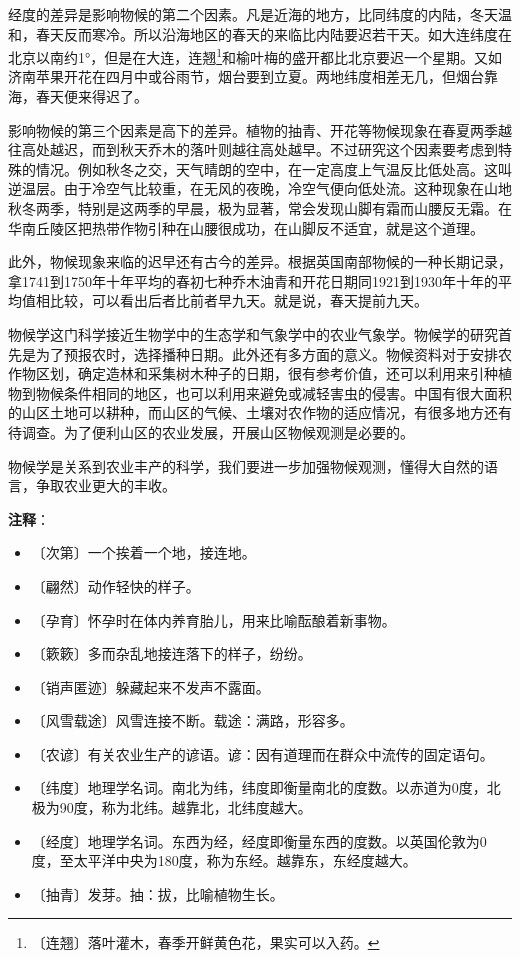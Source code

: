 \documentclass[12pt,UTF-8,openany]{ctexbook}
\begin{document}
\begin{normalsize}
    经度的差异是影响物候的第二个因素。凡是近海的地方，比同纬度的内陆，冬天温和，春天反而寒冷。所以沿海地区的春天的来临比内陆要迟若干天。如大连纬度在北京以南约1°，但是在大连，连翘\footnote{〔连翘〕落叶灌木，春季开鲜黄色花，果实可以入药。}和榆叶梅的盛开都比北京要迟一个星期。又如济南苹果开花在四月中或谷雨节，烟台要到立夏。两地纬度相差无几，但烟台靠海，春天便来得迟了。
    
    影响物候的第三个因素是高下的差异。植物的抽青、开花等物候现象在春夏两季越往高处越迟，而到秋天乔木的落叶则越往高处越早。不过研究这个因素要考虑到特殊的情况。例如秋冬之交，天气晴朗的空中，在一定高度上气温反比低处高。这叫逆温层。由于冷空气比较重，在无风的夜晚，冷空气便向低处流。这种现象在山地秋冬两季，特别是这两季的早晨，极为显著，常会发现山脚有霜而山腰反无霜。在华南丘陵区把热带作物引种在山腰很成功，在山脚反不适宜，就是这个道理。
    
    此外，物候现象来临的迟早还有古今的差异。根据英国南部物候的一种长期记录，拿1741到1750年十年平均的春初七种乔木油青和开花日期同1921到1930年十年的平均值相比较，可以看出后者比前者早九天。就是说，春天提前九天。
    
    物候学这门科学接近生物学中的生态学和气象学中的农业气象学。物候学的研究首先是为了预报农时，选择播种日期。此外还有多方面的意义。物候资料对于安排农作物区划，确定造林和采集树木种子的日期，很有参考价值，还可以利用来引种植物到物候条件相同的地区，也可以利用来避免或减轻害虫的侵害。中国有很大面积的山区土地可以耕种，而山区的气候、土壤对农作物的适应情况，有很多地方还有待调查。为了便利山区的农业发展，开展山区物候观测是必要的。
    
    物候学是关系到农业丰产的科学，我们要进一步加强物候观测，懂得大自然的语言，争取农业更大的丰收。
    
\end{normalsize}


\newpage

\textbf{注释}：

\vspace{-1em}

\begin{itemize}
    \setlength\itemsep{-0.2em}
    \item 〔次第〕一个挨着一个地，接连地。
    \item 〔翩然〕动作轻快的样子。
    \item 〔孕育〕怀孕时在体内养育胎儿，用来比喻酝酿着新事物。
    \item 〔簌簌〕多而杂乱地接连落下的样子，纷纷。
    \item 〔销声匿迹〕躲藏起来不发声不露面。
    \item 〔风雪载途〕风雪连接不断。载途：满路，形容多。
    \item 〔农谚〕有关农业生产的谚语。谚：因有道理而在群众中流传的固定语句。
    \item 〔纬度〕地理学名词。南北为纬，纬度即衡量南北的度数。以赤道为0度，北极为90度，称为北纬。越靠北，北纬度越大。
    \item 〔经度〕地理学名词。东西为经，经度即衡量东西的度数。以英国伦敦为0度，至太平洋中央为180度，称为东经。越靠东，东经度越大。
    \item 〔抽青〕发芽。抽：拔，比喻植物生长。
\end{itemize}
\end{document}
